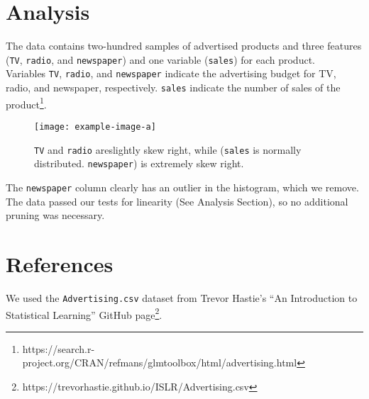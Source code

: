 \documentclass{article}
\begin{document}
\section{Analysis}
 The data contains two-hundred samples of advertised products and three features (\texttt{TV}, \texttt{radio}, and \texttt{newspaper}) and one variable (\texttt{sales}) for each product.\\
 Variables \texttt{TV}, \texttt{radio}, and \texttt{newspaper} indicate the advertising budget for TV, radio, and newspaper, respectively. \texttt{sales} indicate the number of sales of the product\footnote{https://search.r-project.org/CRAN/refmans/glmtoolbox/html/advertising.html}. 
\begin{figure}[!h]
	\centering
\texttt{[image: example-image-a]}
\caption{\texttt{TV} and \texttt{radio} areslightly skew right, while (\texttt{sales} is normally distributed.   \texttt{newspaper}) is extremely skew right.}
\end{figure}


The \texttt{newspaper} column clearly has an outlier in the histogram, which we remove.  The data passed our tests for linearity (See Analysis Section), so no additional pruning was necessary.


\section{References}
We used the \texttt{Advertising.csv} dataset from Trevor Hastie’s “An Introduction to Statistical Learning”  GitHub page\footnote{https://trevorhastie.github.io/ISLR/Advertising.csv}.
\end{document}
